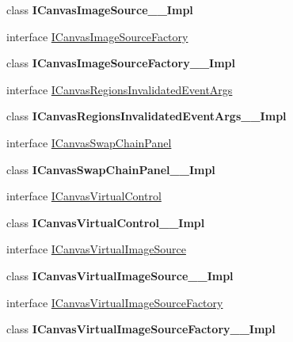 \begin{DoxyCompactItemize}
class {\bfseries I\+Canvas\+Image\+Source\+\_\+\+\_\+\+Impl}
\item 
interface \hyperlink{interface_microsoft_1_1_graphics_1_1_canvas_1_1_u_i_1_1_xaml_1_1_i_canvas_image_source_factory}{I\+Canvas\+Image\+Source\+Factory}
\item 
class {\bfseries I\+Canvas\+Image\+Source\+Factory\+\_\+\+\_\+\+Impl}
\item 
interface \hyperlink{interface_microsoft_1_1_graphics_1_1_canvas_1_1_u_i_1_1_xaml_1_1_i_canvas_regions_invalidated_event_args}{I\+Canvas\+Regions\+Invalidated\+Event\+Args}
\item 
class {\bfseries I\+Canvas\+Regions\+Invalidated\+Event\+Args\+\_\+\+\_\+\+Impl}
\item 
interface \hyperlink{interface_microsoft_1_1_graphics_1_1_canvas_1_1_u_i_1_1_xaml_1_1_i_canvas_swap_chain_panel}{I\+Canvas\+Swap\+Chain\+Panel}
\item 
class {\bfseries I\+Canvas\+Swap\+Chain\+Panel\+\_\+\+\_\+\+Impl}
\item 
interface \hyperlink{interface_microsoft_1_1_graphics_1_1_canvas_1_1_u_i_1_1_xaml_1_1_i_canvas_virtual_control}{I\+Canvas\+Virtual\+Control}
\item 
class {\bfseries I\+Canvas\+Virtual\+Control\+\_\+\+\_\+\+Impl}
\item 
interface \hyperlink{interface_microsoft_1_1_graphics_1_1_canvas_1_1_u_i_1_1_xaml_1_1_i_canvas_virtual_image_source}{I\+Canvas\+Virtual\+Image\+Source}
\item 
class {\bfseries I\+Canvas\+Virtual\+Image\+Source\+\_\+\+\_\+\+Impl}
\item 
interface \hyperlink{interface_microsoft_1_1_graphics_1_1_canvas_1_1_u_i_1_1_xaml_1_1_i_canvas_virtual_image_source_factory}{I\+Canvas\+Virtual\+Image\+Source\+Factory}
\item 
class {\bfseries I\+Canvas\+Virtual\+Image\+Source\+Factory\+\_\+\+\_\+\+Impl}
\end{DoxyCompactItemize}
